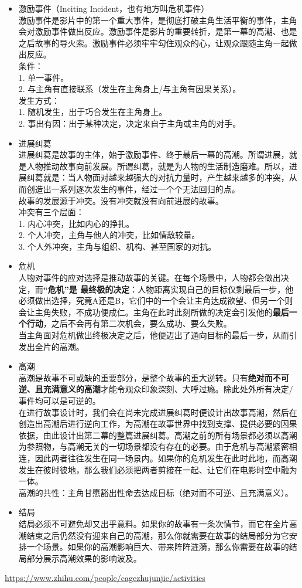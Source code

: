 \documentclass[UTF8,9pt]{ctexart}
\begin{document}
\begin{itemize}
\item 激励事件（Inciting Incident，也有地方叫危机事件）\\
    激励事件是影片中的第一个重大事件，是彻底打破主角生活平衡的事件，主角会对激励事件做出反应。激励事件是影片的重要转折，是第一幕的高潮、也是之后故事的导火索。激励事件必须牢牢勾住观众的心，让观众跟随主角一起做出反应。\\
    条件：\\
    1. 单一事件。\\
    2. 与主角有直接联系（发生在主角身上/与主角有因果关系）。\\
    发生方式：\\
    1. 随机发生，出于巧合发生在主角身上。\\
    2. 事出有因：出于某种决定，决定来自于主角或主角的对手。
\item 进展纠葛\\
    进展纠葛是故事的主体，始于激励事件、终于最后一幕的高潮。所谓进展，就是人物推动故事向前发展。所谓纠葛，就是为人物的生活制造磨难。所以，进展纠葛就是：当人物面对越来越强大的对抗力量时，产生越来越多的冲突，从而创造出一系列逐次发生的事件，经过一个个无法回归的点。\\
    故事的发展源于冲突。没有冲突就没有向前进展的故事。\\
    冲突有三个层面：\\
    1. 内心冲突，比如内心的挣扎。\\
    2. 个人冲突，主角与他人的冲突，比如情敌较量。\\
    3. 个人外冲突，主角与组织、机构、甚至国家的对抗。
\item 危机\\
    人物对事件的应对选择是推动故事的关键。在每个场景中，人物都会做出决定，而{\bf“危机”是 最终极的决定}：人物距离实现自己的目标仅剩最后一步，他必须做出选择，究竟A还是B，它们中的一个会让主角达成欲望、但另一个则会让主角失败，不成功便成仁。主角在此时此刻所做的决定会引发他的{\bf 最后一个行动}，之后不会再有第二次机会，要么成功、要么失败。\\
    当主角面对危机做出终极决定之后，他便迈出了通向目标的最后一步，从而引发出全片的高潮。
\item 高潮\\
    高潮是故事不可或缺的重要部分，是整个故事的重大逆转。只有{\bf 绝对而不可逆、且充满意义的高潮}才能令观众印象深刻、大呼过瘾。除此处外所有决定/事件均可以是可逆的。\\
    在进行故事设计时，我们会在尚未完成进展纠葛时便设计出故事高潮，然后在创造出高潮后进行逆向工作，为高潮在故事世界中找到支撑、提供必要的因果依据，由此设计出第二幕的整篇进展纠葛。高潮之前的所有场景都必须以高潮为参照物，与高潮无关的一切场景都没有存在的必要。由于危机与高潮紧密相连，因此两者往往发生在同一场景内。如果你的危机发生在此时此地，而高潮发生在彼时彼地，那么我们必须把两者剪接在一起、让它们在电影时空中融为一体。\\
    高潮的共性：主角甘愿豁出性命去达成目标（绝对而不可逆、且充满意义）。
\item 结局\\
    结局必须不可避免却又出乎意料。如果你的故事有一条次情节，而它在全片高潮结束之后仍然没有迎来自己的高潮，那么你就需要在故事的结局部分为它安排一个场景。如果你的高潮影响巨大、带来阵阵涟漪，那么你需要在故事的结局部分展示高潮效果的影响波及。
\end{itemize}
\url{https://www.zhihu.com/people/cagezhujunjie/activities}
\end{document}
